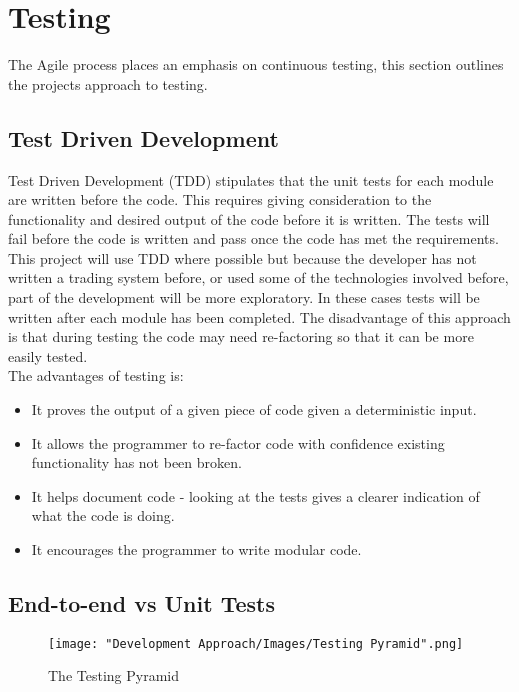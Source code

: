 	\section{Testing}
	The Agile process places an emphasis on continuous testing, this section outlines the projects approach to testing.	
	
		\subsection{Test Driven Development}
		 Test Driven Development (TDD) stipulates that the unit tests for each module are written before the code. This requires giving consideration to the functionality and desired output of the code before it is written. The tests will fail before the code is written and pass once the code has met the requirements.\\ 
		 
		 This project will use TDD where possible but because the developer has not written a trading system before, or used some of the technologies involved before, part of the development will be more exploratory. In these cases tests will be written after each module has been completed. The disadvantage of this approach is that during testing the code may need re-factoring so that it can be more easily tested.\\
		 	
		The advantages of testing is:		
		
		\begin{itemize}
			\item It proves the output of a given piece of code given a deterministic input.
			\item It allows the programmer to re-factor code with confidence existing functionality has not been broken.
			\item It helps document code - looking at the tests gives a clearer indication of what the code is doing.
			\item It encourages the programmer to write modular code.	
		\end{itemize}				
		 	
		\subsection{End-to-end vs Unit Tests}
			\begin{figure}[htp]
				\centering
				\texttt{[image: "Development Approach/Images/Testing Pyramid".png]}
				\caption{The Testing Pyramid}
    				\label{fig:theTestingPyramid}
			\end{figure}	

